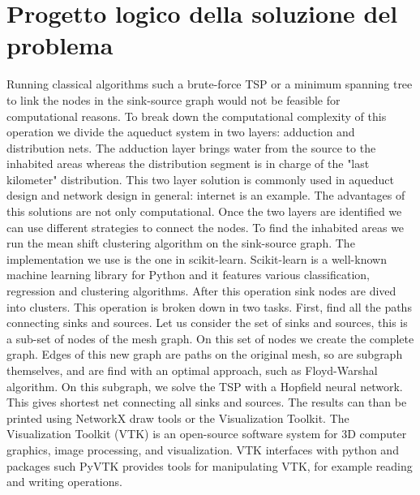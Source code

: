 \chapter{Progetto logico della soluzione del problema}
\label{capitolo4}
\thispagestyle{empty}



\noindent Running classical algorithms such a brute-force TSP or a minimum spanning tree to link
the nodes in the sink-source graph would not be feasible for computational reasons. To
break down the computational complexity of this operation we divide the aqueduct system
in two layers: adduction and distribution nets. The adduction layer brings water from the
source to the inhabited areas whereas the distribution segment is in charge of the "last
kilometer" distribution. This two layer solution is commonly used in aqueduct design and
network design in general: internet is an example. The advantages of this solutions are
not only computational. Once the two layers are identified we can use different strategies
to connect the nodes.
To find the inhabited areas we run the mean shift clustering algorithm on the sink-source
graph. The implementation we use is the one in scikit-learn. Scikit-learn is a well-known
machine learning library for Python and it features various classification, regression and
clustering algorithms. After this operation sink nodes are dived into clusters.
This operation is broken down in two tasks. First, find all the paths connecting sinks
and sources. Let us consider the set of sinks and sources, this is a sub-set of nodes of the
mesh graph. On this set of nodes we create the complete graph. Edges of this new graph
are paths on the original mesh, so are subgraph themselves, and are find with an optimal
approach, such as Floyd-Warshal algorithm. On this subgraph, we solve the TSP with a
Hopfield neural network. This gives shortest net connecting all sinks and sources.
The results can than be printed using NetworkX draw tools or the Visualization Toolkit.
The Visualization Toolkit (VTK) is an open-source software system for 3D computer
graphics, image processing, and visualization. VTK interfaces with python and packages
such PyVTK provides tools for manipulating VTK, for example reading and writing
operations.

